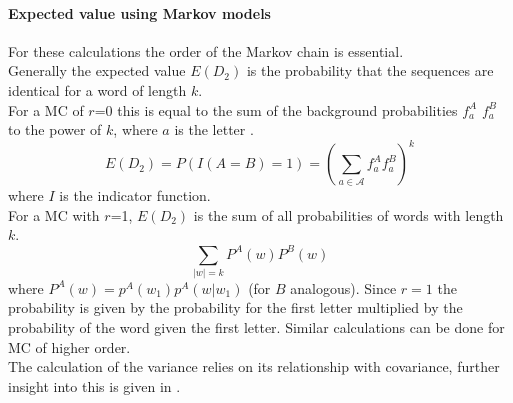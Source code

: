 \documentclass[twocolumn]{bmcart}%
\begin{document}
\paragraph*{Expected value using Markov models}
For these calculations the order of the Markov chain is essential.\\
Generally the expected value $E(D_2)$ is the probability that the sequences are identical for a word of length $k$. \\
For a MC of $r$=0 this is equal to  the sum of the background probabilities $f_a^A$ $f_a^B$ to the power of $k$, where $a$ is the letter .
$$E(D_2)=P(I(A=B)=1)=\left(\sum_{a \in \mathcal{A}}f_a^Af_a^B\right)^k$$
where $I$ is the indicator function.\\
For a MC with $r$=1, $E(D_2)$ is the sum of all probabilities of words with length $k$. $$\sum_{|w|=k}P^A(w)P^B(w)$$
where $P^A(w)=p^A(w_1)p^A(w|w_1)$ (for $B$ analogous). Since $r=1$ the probability is given by the probability for the first letter multiplied by the probability of the word given the first letter. Similar calculations can be done for MC of higher order.\\
The calculation of the variance relies on its relationship with covariance, further insight into this is given in \cite{kantorovitz2007statistical}.
\end{document}

